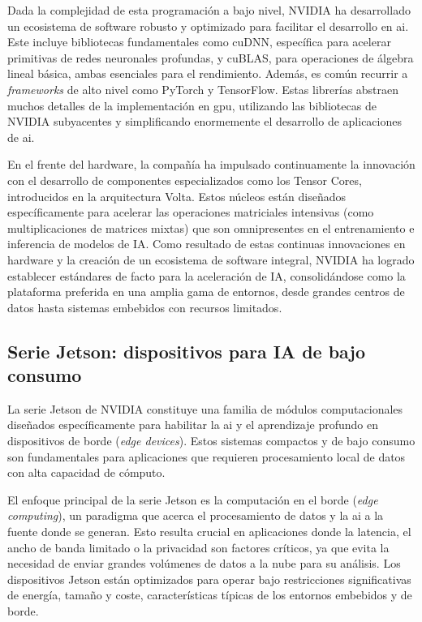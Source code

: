 \documentclass[11pt,spanish,listoffigures,listoftables]{tfgetsinf}
\begin{document}
Dada la complejidad de esta programación a bajo nivel, NVIDIA ha desarrollado un ecosistema de software robusto y optimizado para facilitar el desarrollo en \gls{ai}. Este incluye bibliotecas fundamentales como cuDNN, específica para acelerar primitivas de redes neuronales profundas, y cuBLAS, para operaciones de álgebra lineal básica, ambas esenciales para el rendimiento. Además, es común recurrir a \textit{frameworks} de alto nivel como PyTorch y TensorFlow. Estas librerías abstraen muchos detalles de la implementación en \gls{gpu}, utilizando las bibliotecas de NVIDIA subyacentes y simplificando enormemente el desarrollo de aplicaciones de \gls{ai}.

En el frente del hardware, la compañía ha impulsado continuamente la innovación con el desarrollo de componentes especializados como los Tensor Cores, introducidos en la arquitectura Volta. Estos núcleos están diseñados específicamente para acelerar las operaciones matriciales intensivas (como multiplicaciones de matrices mixtas) que son omnipresentes en el entrenamiento e inferencia de modelos de IA. Como resultado de estas continuas innovaciones en hardware y la creación de un ecosistema de software integral, NVIDIA ha logrado establecer estándares de facto para la aceleración de IA, consolidándose como la plataforma preferida en una amplia gama de entornos, desde grandes centros de datos hasta sistemas embebidos con recursos limitados.


\subsection{Serie Jetson: dispositivos para IA de bajo consumo} \label{sec:jetson}
La serie Jetson de NVIDIA constituye una familia de módulos computacionales diseñados específicamente para habilitar la \gls{ai} y el aprendizaje profundo en dispositivos de borde (\textit{edge devices}). Estos sistemas compactos y de bajo consumo son fundamentales para aplicaciones que requieren procesamiento local de datos con alta capacidad de cómputo.

El enfoque principal de la serie Jetson es la computación en el borde (\textit{edge computing}), un paradigma que acerca el procesamiento de datos y la \gls{ai} a la fuente donde se generan. Esto resulta crucial en aplicaciones donde la latencia, el ancho de banda limitado o la privacidad son factores críticos, ya que evita la necesidad de enviar grandes volúmenes de datos a la nube para su análisis. Los dispositivos Jetson están optimizados para operar bajo restricciones significativas de energía, tamaño y coste, características típicas de los entornos embebidos y de borde.
\end{document}
